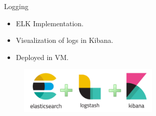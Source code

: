 \begin{frame}{Logging}
	\begin{itemize}
	\item ELK Implementation.
        \item Visualization of logs in  Kibana.
        \item Deployed in VM.
	\end{itemize}
	\begin{figure}[htbp]
  		\centering
  		\includegraphics[width=0.6\textwidth]{figures/elk}
	\end{figure}
\end{frame}